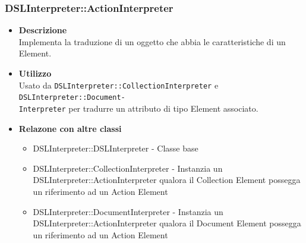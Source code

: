 \subsubsection{DSLInterpreter::ActionInterpreter}
\begin{itemize}
\item \textbf{Descrizione} \hfill \\
Implementa la traduzione di un oggetto che abbia le caratteristiche di un  Element.
\item \textbf{Utilizzo} \hfill \\
Usato da \texttt{DSLInterpreter::CollectionInterpreter} e \texttt{DSLInterpreter::Document-}\\\texttt{Interpreter} per tradurre un attributo di tipo  Element associato.
\item \textbf{Relazone con altre classi}
\begin{itemize}
\item DSLInterpreter::DSLInterpreter - Classe base
\item DSLInterpreter::CollectionInterpreter - Instanzia un DSLInterpreter::ActionInterpreter qualora il Collection Element possegga un riferimento ad un Action Element
\item DSLInterpreter::DocumentInterpreter - Instanzia un DSLInterpreter::ActionInterpreter qualora il Document Element possegga un riferimento ad un Action Element
\end{itemize}
\end{itemize}

